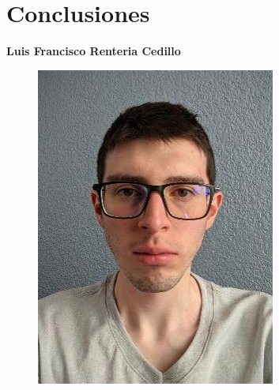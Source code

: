 \documentclass[12pt,twoside]{article}
\begin{document}
    \section{Conclusiones}
    \textbf{\large Luis Francisco Renteria Cedillo}
    \begin{figure}[H]
        \centering
        \includegraphics[angle=0, scale=0.5]{imagenes/foto1.png}
    \end{figure}
    
\end{document}
